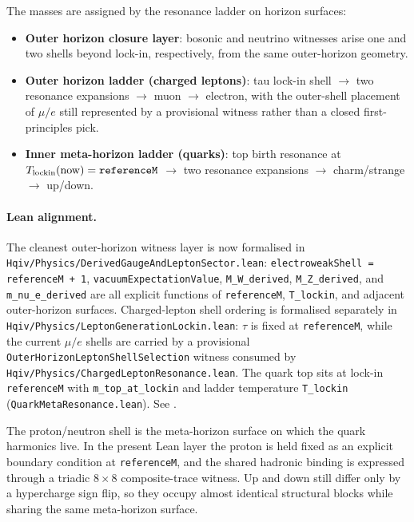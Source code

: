 \documentclass[12pt,a4paper]{article}
\begin{document}
The masses are assigned by the resonance ladder on horizon surfaces:
\begin{itemize}
    \item \textbf{Outer horizon closure layer}: bosonic and neutrino witnesses arise one and two shells beyond lock-in, respectively, from the same outer-horizon geometry.
    \item \textbf{Outer horizon ladder (charged leptons)}: tau lock-in shell \(\to\) two resonance expansions \(\to\) muon \(\to\) electron, with the outer-shell placement of \(\mu/e\) still represented by a provisional witness rather than a closed first-principles pick.
    \item \textbf{Inner meta-horizon ladder (quarks)}: top birth resonance at \(T_{\rm lockin}(\mathrm{now}) = \texttt{referenceM}\) \(\to\) two resonance expansions \(\to\) charm/strange \(\to\) up/down.
\end{itemize}

\paragraph{Lean alignment.}
The cleanest outer-horizon witness layer is now formalised in \texttt{Hqiv/Physics/DerivedGaugeAndLeptonSector.lean}: \texttt{electroweakShell = referenceM + 1}, \texttt{vacuumExpectationValue}, \texttt{M\_W\_derived}, \texttt{M\_Z\_derived}, and \texttt{m\_nu\_e\_derived} are all explicit functions of \texttt{referenceM}, \texttt{T\_lockin}, and adjacent outer-horizon surfaces. Charged-lepton shell ordering is formalised separately in \texttt{Hqiv/Physics/LeptonGenerationLockin.lean}: \(\tau\) is fixed at \texttt{referenceM}, while the current \(\mu/e\) shells are carried by a provisional \texttt{OuterHorizonLeptonShellSelection} witness consumed by \texttt{Hqiv/Physics/ChargedLeptonResonance.lean}. The quark top sits at lock-in \texttt{referenceM} with \texttt{m\_top\_at\_lockin} and ladder temperature \texttt{T\_lockin} (\texttt{QuarkMetaResonance.lean}). See \citep{hqiv-lean}.

The proton/neutron shell is the meta-horizon surface on which the quark harmonics live. In the present Lean layer the proton is held fixed as an explicit boundary condition at \texttt{referenceM}, and the shared hadronic binding is expressed through a triadic \(8\times8\) composite-trace witness. Up and down still differ only by a hypercharge sign flip, so they occupy almost identical structural blocks while sharing the same meta-horizon surface.
\end{document}
